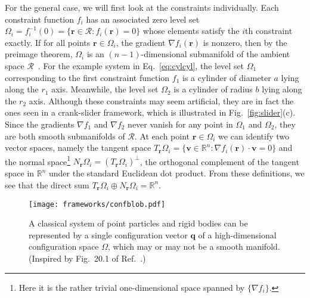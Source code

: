 For the general case, we will first look at the constraints individually.
Each constraint function $f_i$ has an associated zero level set $\Omega_i = f_i^{-1}(0) = \{\bm{r} \in \mathscr{R}: f_i(\bm{r}) = 0\}$ whose elements satisfy the $i$th constraint exactly.
If for all points $\bm{r} \in \Omega_{i}$, the gradient $\nabla f_i(\bm{r})$ is nonzero, then by the preimage theorem, $\Omega_i$ is an $(n-1)$-dimensional submanifold of the ambient space $\mathscr{R}$~\cite{guillemin1974,lee2013}.
For the example system in Eq.~\eqref{eq:cylcyl}, the level set $\Omega_1$ corresponding to the first constraint function $f_1$ is a cylinder of diameter $a$ lying along the $r_{1}$ axis.
Meanwhile, the level set $\Omega_2$ is a cylinder of radius $b$ lying along the $r_{2}$ axis.
Although these constraints may seem artificial, they are in fact the ones seen in a crank-slider framework, which is illustrated in Fig.~\ref{fig:slider}(c).
Since the gradients $\nabla f_1$ and $\nabla f_2$ never vanish for any point in $\Omega_1$ and $\Omega_2$, they are both smooth submanifolds of $\mathscr{R}$.
At each point $\bm{r} \in \Omega_i$ we can identify two vector spaces, namely the tangent space $T_{\bm{r}}\Omega_i = \{\bm{v} \in \mathbb{R}^n: \nabla f_i(\bm{r})\cdot \bm{v} = 0\}$ and the normal space\footnote{Here it is the rather trivial one-dimensional space spanned by $\{\nabla f_i\}$.} $N_{\bm{r}}\Omega_i = (T_{\bm{r}}\Omega_i)^\perp$, the orthogonal complement of the tangent space in $\mathbb{R}^n$ under the standard Euclidean dot product.
From these definitions, we see that the direct sum $T_{\bm{r}}\Omega_i\oplus N_{\bm{r}}\Omega_i = \mathbb{R}^n$.
%
\begin{figure}
  \begin{center}
    \texttt{[image: frameworks/confblob.pdf]}
  \end{center}
  \caption{A classical system of point particles and rigid bodies can be represented by a single configuration vector $\bm{q}$ of a high-dimensional configuration space $\Omega$, which may or may not be a smooth manifold. (Inspired by Fig.~20.1 of Ref.~\cite{penrose2004}.)}
  \label{fig:confblob}
\end{figure}

